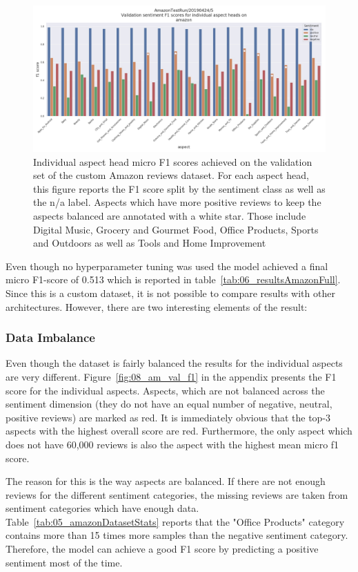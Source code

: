 \begin{figure}[htb]
    \centering
    \includegraphics[width=\textwidth]{figures/06_results/06_am_final_val_f1Sent}
    \caption{Individual aspect head micro F1 scores achieved on the validation set of the custom Amazon reviews dataset. For each aspect head, this figure reports the F1 score split by the sentiment class as well as the n/a label. Aspects which have more positive reviews to keep the aspects balanced are annotated with a white star. Those include Digital Music, Grocery and Gourmet Food, Office Products, Sports and Outdoors as well as Tools and Home Improvement}
    \label{fig:06_am_val_f1sent}
\end{figure}

Even though no hyperparameter tuning was used the model achieved a final micro F1-score of 0.513 which is reported in table~\ref{tab:06_resultsAmazonFull}. Since this is a custom dataset, it is not possible to compare results with other architectures. However, there are two interesting elements of the result:
\medskip

\subsubsection*{Data Imbalance}
Even though the dataset is fairly balanced the results for the individual aspects are very different. Figure~\ref{fig:08_am_val_f1} in the appendix presents the F1 score for the individual aspects. Aspects, which are not balanced across the sentiment dimension {(they do not have an equal number of negative, neutral, positive reviews)} are marked as red. It is immediately obvious that the top-3 aspects with the highest overall score are red. Furthermore, the only aspect which does not have 60,000 reviews is also the aspect with the highest mean micro f1 score. 
\smallskip

The reason for this is the way aspects are balanced. If there are not enough reviews for the different sentiment categories, the missing reviews are taken from sentiment categories which have enough data. Table~\ref{tab:05_amazonDatasetStats} reports that the "Office Products" category contains more than 15 times more samples than the negative sentiment category. Therefore, the model can achieve a good F1 score by predicting a positive sentiment most of the time.
\smallskip

